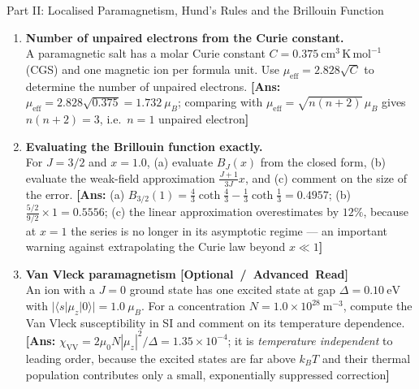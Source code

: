 \documentclass[11pt,a4paper]{article}
\newcommand{\extratag}{\hfill\mbox{\normalfont\footnotesize\sffamily\color{secondary}\textbf{[Optional / Advanced Read]}}}
\begin{document}
\begin{assignmentbox}{Part II: Localised Paramagnetism, Hund's Rules and the Brillouin Function}
\begin{enumerate}[label=\textbf{II.\arabic*.}, leftmargin=*]
    \item \textbf{Number of unpaired electrons from the Curie constant.}\\
    A paramagnetic salt has a molar Curie constant $C = 0.375\ \mathrm{cm^3\,K\,mol^{-1}}$ (CGS) and one magnetic ion per formula unit. Use $\mu_{\mathrm{eff}} = 2.828\sqrt{C}$ to determine the number of unpaired electrons.
    \textbf{[Ans:} $\mu_{\mathrm{eff}} = 2.828\sqrt{0.375} = 1.732\ \mu_B$; comparing with $\mu_{\mathrm{eff}} = \sqrt{n(n+2)}\,\mu_B$ gives $n(n+2) = 3$, i.e.\ $n = 1$ unpaired electron\textbf{]}

    \item \textbf{Evaluating the Brillouin function exactly.}\\
    For $J = 3/2$ and $x = 1.0$, (a) evaluate $B_J(x)$ from the closed form, (b) evaluate the weak-field approximation $\frac{J+1}{3J}x$, and (c) comment on the size of the error.
    \textbf{[Ans:} (a) $B_{3/2}(1) = \frac{4}{3}\coth\frac{4}{3} - \frac{1}{3}\coth\frac{1}{3} = 0.4957$; (b) $\frac{5/2}{9/2}\times1 = 0.5556$; (c) the linear approximation overestimates by $12\%$, because at $x = 1$ the series is no longer in its asymptotic regime --- an important warning against extrapolating the Curie law beyond $x \ll 1$\textbf{]}

    \item \textbf{Van Vleck paramagnetism \extratag}\\
    An ion with a $J = 0$ ground state has one excited state at gap $\Delta = 0.10\ \mathrm{eV}$ with $|\langle s|\mu_z|0\rangle| = 1.0\ \mu_B$. For a concentration $N = 1.0\times10^{28}\ \mathrm{m^{-3}}$, compute the Van Vleck susceptibility in SI and comment on its temperature dependence.
    \textbf{[Ans:} $\chi_{\mathrm{VV}} = 2\mu_0N|\mu_z|^2/\Delta = 1.35\times10^{-4}$; it is \emph{temperature independent} to leading order, because the excited states are far above $k_BT$ and their thermal population contributes only a small, exponentially suppressed correction\textbf{]}


\end{enumerate}
\end{assignmentbox}
\end{document}
